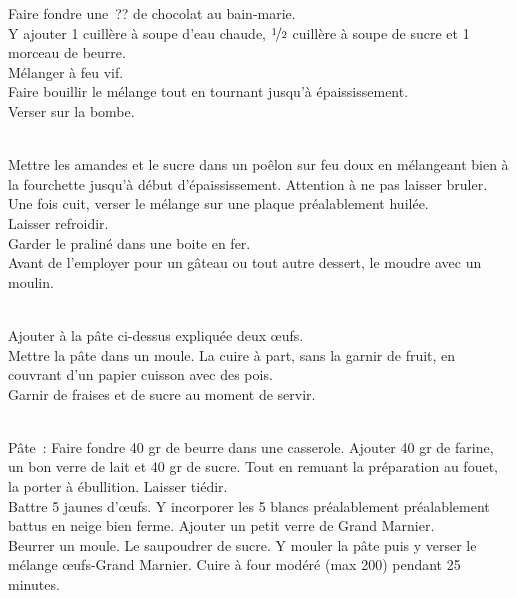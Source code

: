 \begin{minipage}[c]{\textwidth}
Faire fondre une ?? de chocolat au bain-marie.\\
Y ajouter 1 cuillère à soupe d’eau chaude, $\nicefrac{1}{2}$ cuillère à soupe de sucre et 1 morceau de beurre.\\
Mélanger à feu vif.\\
Faire bouillir le mélange tout en tournant jusqu’à épaississement.\\
Verser sur la bombe.\\
\\

\end{minipage}

\begin{minipage}[c]{\textwidth}
Mettre les amandes et le sucre dans un poêlon sur feu doux en mélangeant bien à la fourchette jusqu’à début d’épaississement. Attention à ne pas laisser bruler.\\
Une fois cuit, verser le mélange sur une plaque préalablement huilée. \\
Laisser refroidir.\\
Garder le praliné dans une boite en fer.\\
Avant de l’employer pour un gâteau ou tout autre dessert, le moudre avec un moulin.\\
\\

\end{minipage}

\begin{minipage}[c]{\textwidth}
Ajouter à la pâte ci-dessus expliquée deux œufs. \\
Mettre la pâte dans un moule. La cuire à part, sans la garnir de fruit, en couvrant d’un papier cuisson avec des pois.  \\
Garnir de fraises et de sucre au moment de servir.\\
\\

\end{minipage}

\begin{minipage}[c]{\textwidth}
Pâte : Faire fondre 40 gr de beurre dans une casserole. Ajouter 40 gr de farine, un bon verre de lait et 40 gr de sucre. Tout en remuant la préparation au fouet, la porter à ébullition. Laisser tiédir.\\
Battre 5 jaunes d’œufs. Y incorporer les 5 blancs préalablement préalablement battus en neige bien ferme. Ajouter un petit verre de Grand Marnier. \\
Beurrer un moule. Le saupoudrer de sucre. Y mouler la pâte puis y verser le mélange œufs-Grand Marnier. Cuire à four modéré (max 200\degrees) pendant 25 minutes. \\
\\

\end{minipage}

